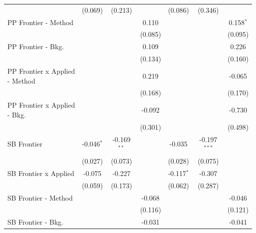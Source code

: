 \begin{tabular}{lcccccc}
                                  & (0.069)       & (0.213)       &               & (0.086)       & (0.346)        &   \\   
   PP Frontier - Method           &               &               & 0.110         &               &                & 0.158$^{*}$\\   
                                  &               &               & (0.085)       &               &                & (0.095)\\   
   PP Frontier - Bkg.             &               &               & 0.109         &               &                & 0.226\\   
                                  &               &               & (0.134)       &               &                & (0.160)\\   
   PP Frontier x Applied - Method &               &               & 0.219         &               &                & -0.065\\   
                                  &               &               & (0.168)       &               &                & (0.170)\\   
   PP Frontier x Applied - Bkg.   &               &               & -0.092        &               &                & -0.730\\   
                                  &               &               & (0.301)       &               &                & (0.498)\\   
   SB Frontier                    & -0.046$^{*}$  & -0.169$^{**}$ &               & -0.035        & -0.197$^{***}$ &   \\   
                                  & (0.027)       & (0.073)       &               & (0.028)       & (0.075)        &   \\   
   SB Frontier x Applied          & -0.075        & -0.227        &               & -0.117$^{*}$  & -0.307         &   \\   
                                  & (0.059)       & (0.173)       &               & (0.062)       & (0.287)        &   \\   
   SB Frontier - Method           &               &               & -0.068        &               &                & -0.046\\   
                                  &               &               & (0.116)       &               &                & (0.121)\\   
   SB Frontier - Bkg.             &               &               & -0.031        &               &                & -0.041\\   

\end{tabular}
